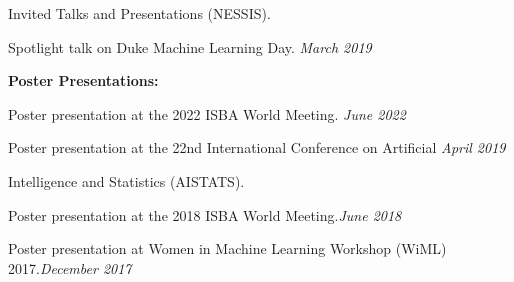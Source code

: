 \documentclass{resume} %
\begin{document}
\begin{rSection}{Invited Talks and Presentations}
\vspace{-0.1in}
 (NESSIS).
 
Spotlight talk on Duke Machine Learning Day. \hfill {\em March 2019}




\medskip

\hspace*{-0.2in}\textbf{Poster Presentations:}

Poster presentation at the 2022 ISBA World Meeting. \hfill {\em June 2022}


Poster presentation at the 22nd International Conference on Artificial  \hfill {\em April 2019}

\vspace{-0.1in}
Intelligence and Statistics (AISTATS).



Poster presentation at the 2018 ISBA World Meeting.\hfill {\em June 2018}


Poster presentation at Women in Machine Learning Workshop (WiML) 2017.\hfill {\em December 2017}

\end{rSection}


\end{document}
